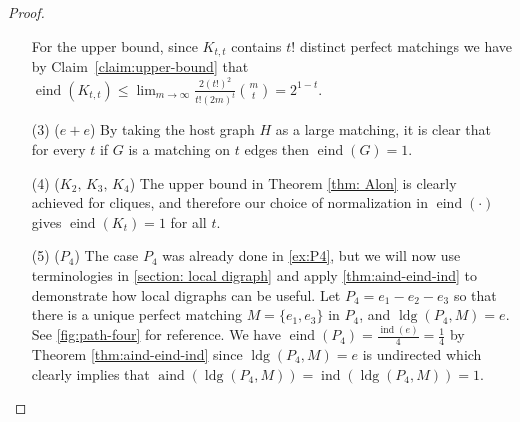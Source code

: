 \documentclass[reqno,11pt]{amsart}
\numberwithin{equation}{section}
\theoremstyle{definition}
\theoremstyle{remark}
\DeclareMathOperator{\ind}{ind}
\DeclareMathOperator{\eind}{eind}
\DeclareMathOperator{\aind}{aind}
\DeclareMathOperator{\ldg}{ldg}
\begin{document}
\begin{proof}
\begin{enumerate}[leftmargin=*,topsep=0pt]
        For the upper bound, since $K_{t,t}$ contains $t!$ distinct perfect matchings we have by Claim~\ref{claim:upper-bound} that $\eind(K_{t,t}) \le \lim_{m\to \infty} \frac{2(t!)^2}{t!(2m)^{t}}\binom{m}{t} = 2^{1-t}$.
    \item [(3)] ($e+e$) By taking the host graph $H$ as a large matching, it is clear that for every $t$ if $G$ is a matching on $t$ edges then $\eind(G) = 1$.  
    \item [(4)] ($K_2, \,  K_3,\, K_4$) The upper bound in  Theorem \ref{thm: Alon} is clearly achieved for cliques, and therefore our choice of normalization in $\eind(\cdot)$ gives $\eind(K_t) = 1$ for all $t$. 
    \item [(5)] ($P_4$) The case $P_4$ was already done in \cref{ex:P4}, but we will now use terminologies in \cref{section: local digraph} and apply \cref{thm:aind-eind-ind} to demonstrate how local digraphs can be useful.
    Let $P_4 = e_1- e_2 - e_3$ so that there is a unique perfect matching $M=\{e_1,e_3\}$ in $P_4$, and $\ldg(P_4, M) = e$.
    See \cref{fig:path-four} for reference.
    We have $\eind(P_4) = \frac{\ind(e)}{4} = \frac{1}{4}$ by Theorem \ref{thm:aind-eind-ind} since $\ldg(P_4, M) = e$ is undirected which clearly implies that $\aind(\ldg(P_4,M)) = \ind(\ldg(P_4, M)) = 1$.

    \begin{figure}[!htp]
        \centering


\end{figure}
\end{enumerate}
\end{proof}
\end{document}
